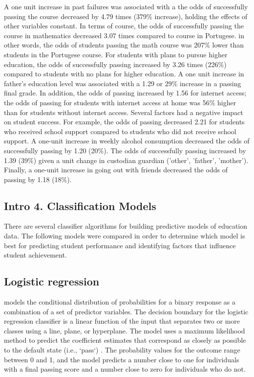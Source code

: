 A one unit increase in past failures was associated with a   the odds of 
successfully passing the 
course decreased by 4.79 times (379\% increase), holding the effects of other 
variables constant. In terms of course, the odds of successfully passing the 
course in mathematics decreased 3.07 times compared to course in Portugese. 
in other words, the odds of students passing the math course was 207\% lower 
than students in the Portugese course. For students with plans to pursue 
higher education, the odds of successfully passing increased by 3.26 times 
(226\%) compared to students with no plans for higher education. A one unit 
increase in father's education level was associated with a 1.29 or 29\% 
increase in a passing final grade. In addition, the odds of passing increased
by 1.56 for internet access; the odds of passing for students with internet 
access at home was 56\% higher than for students without internet access.  
Several factors had a negative impact on student success. For example, the 
odds of passing decreased 2.21 for students who received school support
compared to students who did not receive school support. A one-unit increase
in weekly alcohol consumption decreased the odds of successfully passing by 1.20 
(20\%). The odds of successfully passing increased by 1.39 (39\%) given a unit 
change in custodian guardian ('other', 'father', 'mother'). Finally, a one-unit 
increase in going out with friends decreased the odds of passing by 1.18 (18\%). 









\subsection{Intro 4. Classification Models}

There are several classifier algorithms for building predictive models of
education data. The following models were compared in order to determine
which model is best for predicting student performance and identifying
factors that influence student achievement. 

\subsection{Logistic regression} models the conditional distribution of 
probabilities for a binary response as a combination of a set of predictor 
variables. The decision boundary for the logistic regression classifier is a 
linear function of the input that separates two or more classes using a line, 
plane, or hyperplane. The model uses a maximum likelihood method to predict the 
coefficient estimates that correspond as closely as possible to the default 
state (i.e., `pass`) . The probability values for the outcome range between 
0 and 1, and the model predicts a number close to one for individuals with a 
final passing score and a number close to zero for individuals who do not. 

